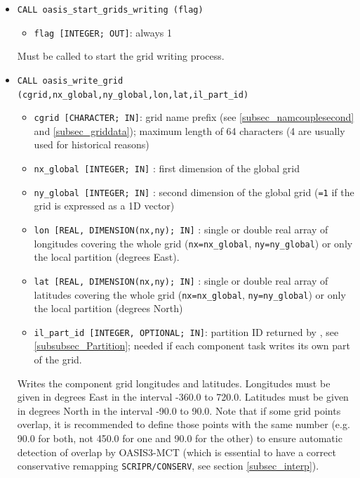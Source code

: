 \begin{itemize}

\item {\tt CALL oasis\_start\_grids\_writing (flag)}
  \begin{itemize}
  \item {\tt flag [INTEGER; OUT]}: always 1
  \end{itemize}
Must be called to start the grid writing process.

  \vspace{0.2cm}
\item {\tt CALL oasis\_write\_grid (cgrid,nx\_global,ny\_global,lon,lat,il\_part\_id)}
  \begin{itemize}
  \item {\tt cgrid [CHARACTER; IN]}: grid name prefix (see
    \ref{subsec_namcouplesecond} and \ref{subsec_griddata}); maximum length of 64 characters (4 are usually used for historical reasons)
  \item {\tt nx\_global [INTEGER; IN]} : first dimension of the global grid
  \item {\tt ny\_global [INTEGER; IN]} : second dimension of the global grid ({\tt =1} if the grid is expressed as a 1D vector)
  \item {\tt lon [REAL, DIMENSION(nx,ny); IN]} : single or double real array of longitudes covering the whole grid ({\tt nx=nx\_global}, {\tt ny=ny\_global}) or only the local partition (degrees East).
  \item {\tt lat [REAL, DIMENSION(nx,ny); IN]} : single or double real array of latitudes covering the whole grid ({\tt nx=nx\_global}, {\tt ny=ny\_global}) or only the local partition (degrees North)
\item  {\tt il\_part\_id [INTEGER, OPTIONAL; IN]}: partition ID returned by , see \ref{subsubsec_Partition}; needed if each component task writes its own part of the grid.
  \end{itemize}

  Writes the component grid longitudes and latitudes. Longitudes must be
  given in degrees East in the interval -360.0 to 720.0. Latitudes
  must be given in degrees North in the interval -90.0 to 90.0. Note
  that if some grid points overlap, it is recommended to define those
  points with the same number (e.g. 90.0 for both, not 450.0 for one
  and 90.0 for the other) to ensure automatic detection of overlap by
  OASIS3-MCT (which is essential to have a correct conservative
  remapping \texttt{SCRIPR/CONSERV}, see section \ref{subsec_interp}).


\end{itemize}
